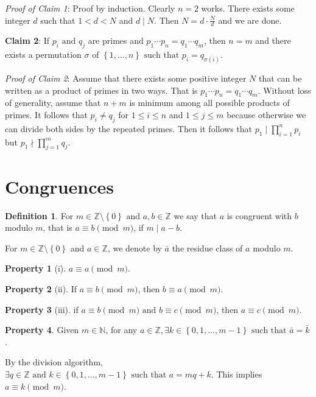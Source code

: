 \documentclass[11pt]{article}
\theoremstyle{definition}
\newtheorem{defn}{Definition}[section]
\newtheorem{pty}{Property}[section]
\newcommand{\sm}[0]{\setminus}
\newcommand{\set}[1]{\left\{ #1 \right\}}
\newcommand{\rng}[2]{#1,\dots,#2}
\newcommand{\st}[0]{\text{ such that }}
\newcommand{\et}[0]{\text{ and }}
\newcommand{\ZZ}{\mathbb{Z}}
\newcommand{\NN}{\mathbb{N}}
\begin{document}
\emph{Proof of Claim 1}: Proof by induction. Clearly $n=2$ works. There exists some integer $d$ such that $1<d<N$ and $d\mid N$. Then $N = d\cdot\frac{N}{d}$ and we are done.

\textbf{Claim 2}: If $p_i \et q_j$ are primes and $p_1\cdots p_n = q_1 \cdots q_m$, then $n=m$ and there exists a permutation $\sigma$ of $\set{\rng{1}{n}} \st p_i=q_{\sigma(i)}$. 

\emph{Proof of Claim 2}: Assume that there exists some positive integer $N$ that can be written as a product of primes in two ways. That is $p_1\cdots p_n = q_1\cdots q_m$. Without loss of generality, assume that $n+m$ is minimum among all possible products of primes. 
It follows that $p_i\neq q_j$ for $1\le i\le n$ and $1\le j\le m$ because otherwise we can divide both sides by the repeated primes. 
Then it follows that $p_1\mid\prod_{i=1}^{n}p_i$ but $p_1\nmid\prod_{j=1}^{m}q_j$. 
\qedhere

\section{Congruences}
\begin{defn} For $m\in\ZZ\sm\set{0} \et a,b\in\ZZ$ we say that $a$ is congruent with $b$ modulo $m$, that is $a\equiv b\pmod{m}$, if $m\mid a-b$. \end{defn}

For $m\in\ZZ\sm\set{0}$ and $a\in\ZZ$, we denote by $\bar{a}$ the residue class of $a$ modulo $m$. 

\begin{pty}[i] $a\equiv a\pmod{m}$. \end{pty}
\begin{pty}[ii] If $a\equiv b\pmod{m}$, then $b\equiv a\pmod{m}$. \end{pty}
\begin{pty}[iii] if $a\equiv b\pmod{m} \et b\equiv c\pmod{m}$, then $a\equiv c\pmod{m}$. \end{pty}

\begin{pty} Given $m\in\NN$, for any $a\in\ZZ, \exists k\in\set{0,\rng{1}{m-1}} \st \bar{a}=\bar{k}$. \end{pty}
\proof By the division algorithm, $\exists q\in\ZZ \et k\in\set{0,\rng{1}{m-1}} \st a=mq+k$. This implies $a\equiv k\pmod{m}$. \qedhere
\end{document}
